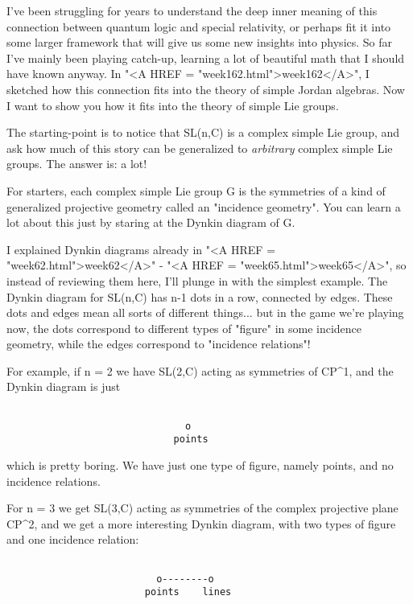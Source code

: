 I've been struggling for years to understand the deep inner meaning of
this connection between quantum logic and special relativity, or perhaps
fit it into some larger framework that will give us some new insights
into physics.    So far I've mainly been playing catch-up, learning a
lot of beautiful math that I should have known anyway.   In "<A HREF = "week162.html">week162</A>", 
I sketched how this connection fits into the theory of simple Jordan 
algebras.  Now I want to show you how it fits into the theory of simple 
Lie groups.  

The starting-point is to notice that SL(n,C) is a complex simple Lie
group, and ask how much of this story can be generalized to \emph{arbitrary}
complex simple Lie groups.  The answer is: a lot!

For starters, each complex simple Lie group G is the symmetries of a
kind of generalized projective geometry called an "incidence geometry".
You can learn a lot about this just by staring at the Dynkin diagram 
of G.

I explained Dynkin diagrams already in "<A HREF = "week62.html">week62</A>" - "<A HREF = "week65.html">week65</A>", so instead
of reviewing them here, I'll plunge in with the simplest example.  The 
Dynkin diagram for SL(n,C) has n-1 dots in a row, connected by edges. 
These dots and edges mean all sorts of different things... but in the
game we're playing now, the dots correspond to different types of
"figure" in some incidence geometry, while the edges correspond to 
"incidence relations"!   

For example, if n = 2 we have SL(2,C) acting as symmetries of CP^{1},
and the Dynkin diagram is just


\begin{verbatim}

                               o
                             points
\end{verbatim}
    
which is pretty boring.  We have just one type of figure, namely
points, and no incidence relations.
          
For n = 3 we get SL(3,C) acting as symmetries of the complex
projective plane CP^{2}, and we get a more interesting Dynkin
diagram, with two types of figure and one incidence relation:


\begin{verbatim}

                          o--------o
                        points    lines  
\end{verbatim}
    
